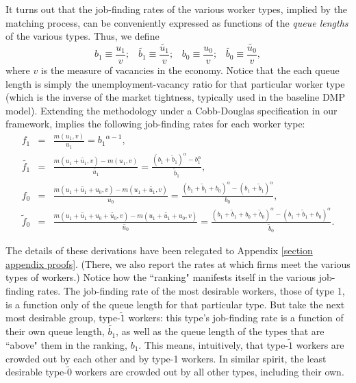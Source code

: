 \documentclass[12pt]{article} %
\theoremstyle{definition}
\begin{document}
It turns out that the job-finding rates of the various worker types, implied by the \cite{petrongolo2001looking} matching process, can be conveniently expressed as functions of the \textit{queue lengths} of the various types. Thus, we define 
\begin{equation}
b_1\equiv \frac{u_1}{v};\,\,\,\,\, \tilde{b_1}\equiv \frac{\tilde{u_1}}{v}; \,\,\,\,\, b_0\equiv \frac{u_0}{v};\,\,\,\,\, \tilde{b_0}\equiv \frac{\tilde{u_0}}{v}, \label{eq queue lengths}
\end{equation}where $v$ is the measure of vacancies in the economy. Notice that the each queue length is simply the unemployment-vacancy ratio for that particular worker type (which is the inverse of the market tightness, typically used in the baseline DMP model). Extending the \cite{petrongolo2001looking} methodology under a Cobb-Douglas specification in our framework, implies the following job-finding rates for each worker type: 
\begin{eqnarray*}
    f_1 &=& \frac{m(u_1,v)}{u_1} = {b_1}^{\alpha-1},\nonumber  \\
     \tilde{f_1} &=& \frac{m(u_1+\tilde{u_1},v)-m(u_1,v)}{\tilde{u_1}} = \frac{(b_1+\tilde{b}_1)^\alpha - b_1^\alpha}{\tilde{b}_1},  \nonumber \\
    f_0 &=& \frac{m(u_1+\tilde{u_1}+u_0,v)-m(u_1+\tilde{u_1},v)}{u_0} = \frac{(b_1+\tilde{b}_1+b_0)^\alpha - (b_1+\tilde{b}_1)^\alpha}{b_0}, \nonumber \\
    \tilde{f}_0 &=& \frac{m(u_1+\tilde{u_1}+u_0+\tilde{u_0},v)-m(u_1+\tilde{u_1}+u_0,v)}{\tilde{u_0}} = \frac{(b_1+\tilde{b}_1+b_0+\tilde{b}_0)^\alpha - ({b_1+\tilde{b}_1+b_0})^\alpha}{\tilde{b}_0}. \nonumber 
\end{eqnarray*}

The details of these derivations have been relegated to Appendix \ref{section appendix proofs}. (There, we also report the rates at which firms meet the various types of workers.) Notice how the ``ranking" manifests itself in the various job-finding rates. The job-finding rate of the most desirable workers, those of type 1, is a function only of the queue length for that particular type. But take the next most desirable group, type-$\tilde{1}$ workers: this type's job-finding rate is a function of their own queue length, $\tilde{b_1}$, as well as the queue length of the types that are ``above" them in the ranking, $b_1$. This means, intuitively, that type-$\tilde{1}$ workers are crowded out by each other and by type-1 workers. In similar spirit, the least desirable type-$\tilde{0}$ workers are crowded out by all other types, including their own. 
\end{document}
